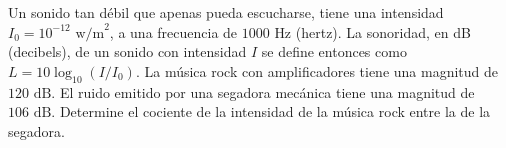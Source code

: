 \item Un sonido tan débil que apenas pueda escucharse, tiene una intensidad $I_0 = 10^{-12} \text{ w/m}^2$, a una frecuencia de $1000 \text{ Hz}$ (hertz). La sonoridad, en dB (decibels), de un sonido con intensidad $I$ se define entonces como $L = 10 \log_{10} (I/I_0)$. La música rock con amplificadores tiene una magnitud de $120 \text{ dB}$. El ruido emitido por una segadora mecánica tiene una magnitud de $106 \text{ dB}$. Determine el cociente de la intensidad de la música rock entre la de la segadora.
